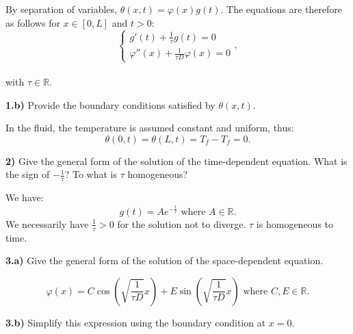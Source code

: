 \begin{breakbox}
    \noindent By separation of variables, $\theta(x,t) = \varphi(x)g(t)$. The equations are therefore as follows for $x \in [0,L]$ and $t > 0$:
    \\
    $$\boxed{
    \begin{cases}
        g'(t) + \frac{1}{\tau}g(t) = 0 \\
        \varphi''(x) + \frac{1}{\tau D}\varphi(x) = 0
    \end{cases},}$$
    \\
    with $\tau \in \mathbb{R}$.
\end{breakbox}

\medskip

\noindent \textbf{1.b)} Provide the boundary conditions satisfied by $\theta(x,t)$.\\

\begin{breakbox}
    \noindent In the fluid, the temperature is assumed constant and uniform, thus:
    $$\boxed{\theta(0,t) = \theta(L, t) = T_f - T_f = 0.}$$
\end{breakbox}

\medskip

\noindent \textbf{2)} Give the general form of the solution of the time-dependent equation. What is the sign of $-\frac{1}{\tau}$? To what is $\tau$ homogeneous?\\

\begin{breakbox}
    \noindent We have: $$\boxed{g(t) = A e^{-\frac{t}{\tau}} \text{ where }A \in \mathbb{R}.}$$ We necessarily have $\displaystyle \frac{1}{\tau} > 0$ for the solution not to diverge.
    $\tau$ is homogeneous to time.
\end{breakbox}

\medskip

\noindent \textbf{3.a)} Give the general form of the solution of the space-dependent equation.\\

\begin{breakbox}
    \noindent $$\boxed{\varphi(x) = C \cos(\sqrt{\frac{1}{\tau D}}x) + E \sin(\sqrt{\frac{1}{\tau D}}x) \text{ where } C, E \in \mathbb{R}.}$$
\end{breakbox}

\medskip

\noindent \textbf{3.b)} Simplify this expression using the boundary condition at $x = 0$.\\

